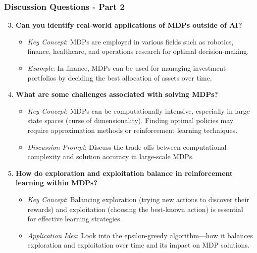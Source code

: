 \documentclass[aspectratio=169]{beamer}
\begin{document}
\begin{frame}[fragile]
    \frametitle{Discussion Questions - Part 2}
    \begin{enumerate}
        \setcounter{enumi}{2} %
        \item \textbf{Can you identify real-world applications of MDPs outside of AI?}
        \begin{itemize}
            \item \textit{Key Concept}: MDPs are employed in various fields such as robotics, finance, healthcare, and operations research for optimal decision-making.
            \item \textit{Example}: In finance, MDPs can be used for managing investment portfolios by deciding the best allocation of assets over time.
        \end{itemize}

        \item \textbf{What are some challenges associated with solving MDPs?}
        \begin{itemize}
            \item \textit{Key Concept}: MDPs can be computationally intensive, especially in large state spaces (curse of dimensionality). Finding optimal policies may require approximation methods or reinforcement learning techniques.
            \item \textit{Discussion Prompt}: Discuss the trade-offs between computational complexity and solution accuracy in large-scale MDPs.
        \end{itemize}

        \item \textbf{How do exploration and exploitation balance in reinforcement learning within MDPs?}
        \begin{itemize}
            \item \textit{Key Concept}: Balancing exploration (trying new actions to discover their rewards) and exploitation (choosing the best-known action) is essential for effective learning strategies.
            \item \textit{Application Idea}: Look into the epsilon-greedy algorithm—how it balances exploration and exploitation over time and its impact on MDP solutions.
        \end{itemize}
    \end{enumerate}
\end{frame}
\end{document}
